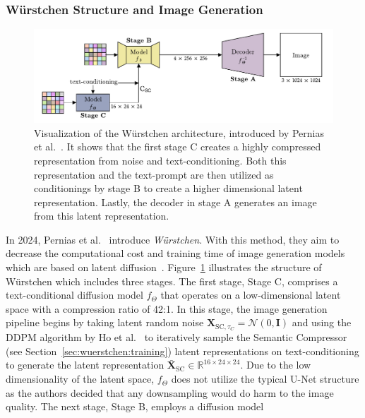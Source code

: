 \subsubsection{W\"urstchen Structure and Image Generation}
\begin{figure}[t]
    \includegraphics[width=\textwidth]{assets/wuerstchen_arch.pdf}
    \caption{Visualization of the W\"urstchen architecture, introduced by
        Pernias et al.~\cite{pernias2024wrstchen}. It shows that the first stage C
        creates a highly compressed representation from noise and text-conditioning.
        Both this representation and the text-prompt are then utilized as conditionings by stage B
        to create a higher dimensional latent representation. Lastly, the decoder
        in stage A generates an image from this latent representation.}
    \label{fig:wuerstchen:arch}
\end{figure}
In 2024, Pernias et al.~\cite{pernias2024wrstchen} introduce \emph{W\"urstchen}.
With this method, they aim to decrease the computational cost and training
time of image generation models which are based on latent diffusion~\cite{rombach2022stablediffusion}.
Figure~\ref{fig:wuerstchen:arch} illustrates the structure of W\"urstchen which
includes three stages. The first stage, Stage C, comprises a
text-conditional diffusion model $f_\Theta$ that operates on a low-dimensional
latent space with a compression ratio of 42:1. In this stage, the image generation 
pipeline begins by taking latent random noise
$\boldsymbol{X}_{\text{SC}, \tau_C} = \mathcal{N}(0, \boldsymbol{\text{I}})$ and
using the DDPM algorithm by Ho et al.~\cite{ho2020denoisingdiffusionprobabilisticmodels} to iteratively
sample the Semantic Compressor (see Section~\ref{sec:wuerstchen:training})
latent representations on text-conditioning to generate the latent representation
$\bar{\boldsymbol{X}}_{\text{SC}}\in\mathbb{R}^{16\times24\times24}$. Due to
the low dimensionality of the latent space, $f_\Theta$ does not utilize the
typical U-Net structure as the authors decided that any downsampling would do
harm to the image quality. The next stage, Stage B, employs a diffusion model
